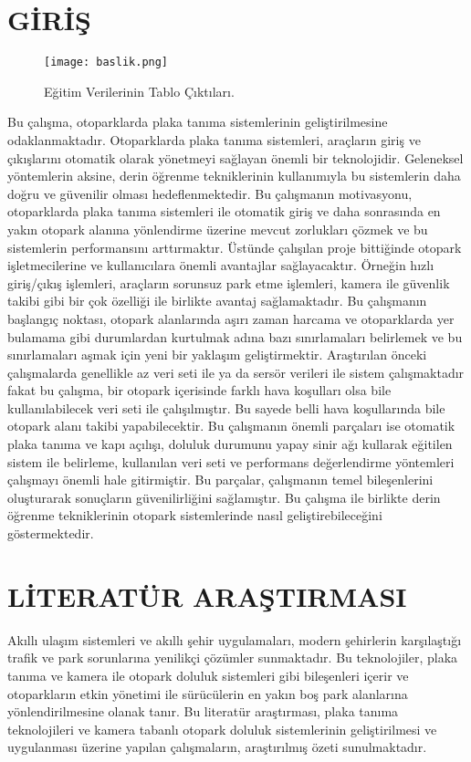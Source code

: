 \documentclass[]{article}
\begin{document}
	\section{GİRİŞ}
	\begin{figure}[!ht]
		\centering
		\texttt{[image: baslik.png]}
		\caption{Eğitim Verilerinin Tablo Çıktıları.}
	\end{figure}
	Bu çalışma, otoparklarda plaka tanıma sistemlerinin geliştirilmesine odaklanmaktadır. Otoparklarda plaka tanıma sistemleri, araçların giriş ve çıkışlarını otomatik olarak yönetmeyi sağlayan önemli bir teknolojidir. Geleneksel yöntemlerin aksine, derin öğrenme tekniklerinin kullanımıyla bu sistemlerin daha doğru ve güvenilir olması hedeflenmektedir. Bu çalışmanın motivasyonu, otoparklarda plaka tanıma sistemleri ile otomatik giriş ve daha sonrasında en yakın otopark alanına yönlendirme üzerine mevcut zorlukları çözmek ve bu sistemlerin performansını arttırmaktır. Üstünde çalışılan proje bittiğinde otopark işletmecilerine ve kullanıcılara önemli avantajlar sağlayacaktır. Örneğin hızlı giriş/çıkış işlemleri, araçların sorunsuz park etme işlemleri, kamera ile güvenlik takibi gibi bir çok özelliği ile birlikte avantaj sağlamaktadır. Bu çalışmanın başlangıç noktası, otopark alanlarında aşırı zaman harcama ve otoparklarda yer bulamama gibi durumlardan kurtulmak adına bazı sınırlamaları belirlemek ve bu sınırlamaları aşmak için yeni bir yaklaşım geliştirmektir. Araştırılan önceki çalışmalarda genellikle az veri seti ile ya da sersör verileri ile sistem çalışmaktadır fakat bu çalışma, bir otopark içerisinde farklı hava koşulları olsa bile kullanılabilecek veri seti ile çalışılmıştır. Bu sayede belli hava koşullarında bile otopark alanı takibi yapabilecektir. Bu çalışmanın önemli parçaları ise otomatik plaka tanıma ve kapı açılışı, doluluk durumunu yapay sinir ağı kullarak eğitilen sistem ile belirleme, kullanılan veri seti ve performans değerlendirme yöntemleri çalışmayı önemli hale gitirmiştir. Bu parçalar, çalışmanın temel bileşenlerini oluşturarak sonuçların güvenilirliğini sağlamıştır. Bu çalışma ile birlikte derin öğrenme tekniklerinin otopark sistemlerinde nasıl geliştirebileceğini göstermektedir.
	
	\section{LİTERATÜR ARAŞTIRMASI}

	Akıllı ulaşım sistemleri ve akıllı şehir uygulamaları, modern şehirlerin karşılaştığı trafik ve park sorunlarına yenilikçi çözümler sunmaktadır. Bu teknolojiler, plaka tanıma ve kamera ile otopark doluluk sistemleri gibi bileşenleri içerir ve otoparkların etkin yönetimi ile sürücülerin en yakın boş park alanlarına yönlendirilmesine olanak tanır. Bu literatür araştırması, plaka tanıma teknolojileri ve kamera tabanlı otopark doluluk sistemlerinin geliştirilmesi ve uygulanması üzerine yapılan çalışmaların, araştırılmış özeti sunulmaktadır.\newline
	
\end{document}
